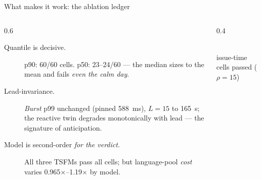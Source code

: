 \documentclass[11pt,aspectratio=169]{beamer}
\begin{document}
\begin{frame}{What makes it work: the ablation ledger}
  \begin{columns}[T]
    \begin{column}{0.6\textwidth}
      \begin{description}
        \item[Quantile is decisive.] p90: 60/60 cells. p50: 23--24/60 --- the median sizes
          to the mean and fails \emph{even the calm day}.
        \item[Lead-invariance.] \emph{Burst} p99 unchanged (pinned \SI{588}{\milli\second}),
          $L{=}15$ to \SI{165}{\second}; the reactive twin degrades monotonically with lead
          --- the signature of anticipation.
        \item[Model is second-order \emph{for the verdict}.] All three TSFMs pass all cells;
          but language-pool \emph{cost} varies 0.965$\times$--1.19$\times$ by model.
      \end{description}
    \end{column}
    \begin{column}{0.4\textwidth}
      \centering
      \\[0.5ex]{\scriptsize issue-time cells passed ($\rho{=}15$)}
    \end{column}
  \end{columns}
\end{frame}
\end{document}
